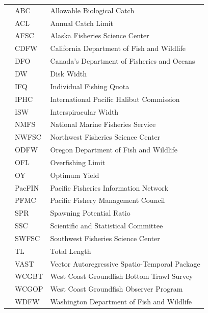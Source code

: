 \documentclass[12pt,]{article}
\begin{document}
\begin{center}
\begin{table}[ht]
\begin{tabular}{rll}
\hline
 &  ABC & Allowable Biological Catch \\ 
 &  ACL & Annual Catch Limit \\ 
 &  AFSC & Alaska Fisheries Science Center \\ 
 &  CDFW & California Department of Fish and Wildlife \\ 
 &  DFO & Canada's Department of Fisheries and Oceans \\
 &  DW & Disk Width \\
 &  IFQ & Individual Fishing Quota \\
 &  IPHC & International Pacific Halibut Commission \\
 &  ISW & Interspiracular Width \\
 &  NMFS & National Marine Fisheries Service \\
 &  NWFSC & Northwest Fisheries Science Center \\
 &  ODFW & Oregon Department of Fish and Wildlife \\
 &  OFL & Overfishing Limit \\
 &  OY & Optimum Yield \\
 &  PacFIN & Pacific Fisheries Information Network \\
 &  PFMC & Pacific Fishery Management Council \\
 &  SPR & Spawning Potential Ratio \\
 &  SSC & Scientific and Statistical Committee \\
 &  SWFSC & Southwest Fisheries Science Center \\
 &  TL & Total Length \\
 &  VAST & Vector Autoregressive Spatio-Temporal Package \\
 &  WCGBT & West Coast Groundfish Bottom Trawl Survey \\
 &  WCGOP & West Coast Groundfish Observer Program \\
 &  WDFW & Washington Department of Fish and Wildlife \\
   \hline
\end{tabular}
\end{table}

\renewcommand{\arraystretch}{1}

\maketitle

\setcounter{page}{1}
\end{center}
\end{document}
